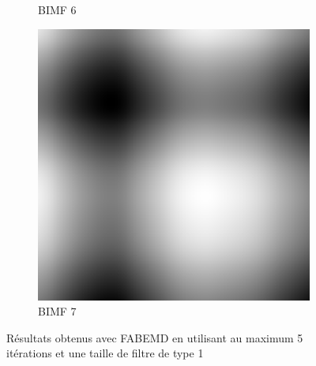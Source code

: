 \begin{figure}
\begin{subfigure}{.30\textwidth}
  \caption{BIMF 6}
\end{subfigure}
\begin{subfigure}{.30\textwidth}
  \centering
  \includegraphics[width=.9\linewidth]{img/s_5_1_7}
  \caption{BIMF 7}
\end{subfigure}
\caption{Résultats obtenus avec FABEMD en utilisant au maximum 5 itérations et une taille de filtre de type 1}
\label{fig:s_5_1}
\end{figure}

